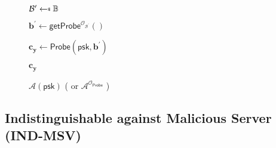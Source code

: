 		
		





	

\begin{figure}[h]
\centering
	\begin{minipage}[t]{0.6\linewidth}
	\centering
	\begin{algorithm}[H]
	\caption{$\mathcal{A}(\textsf{psk})$ ( or $\mathcal{A}^{\mathcal{O}_\textsf{Probe}}$ ) }
	\label{alg:adv:FP}
	\begin{algorithmic}[1]
		\State $\mathcal{B}^\prime \getsdollar \mathbb{B}$
		
		\State $\mathbf{b}^\prime \gets \textsf{getProbe}^{\mathcal{O}_{\mathcal{B}^\prime }}()$

		\State $\mathbf{c_y} \gets \textsf{Probe}(\textsf{psk}, \mathbf{b}^\prime)$ 

		\State \Return $\mathbf{c_y}$
	\end{algorithmic}
	\end{algorithm}
	\end{minipage}
	
\end{figure}







\subsection{Indistinguishable against Malicious Server (IND-MSV)}
\label{sec:ind-msv_game}

